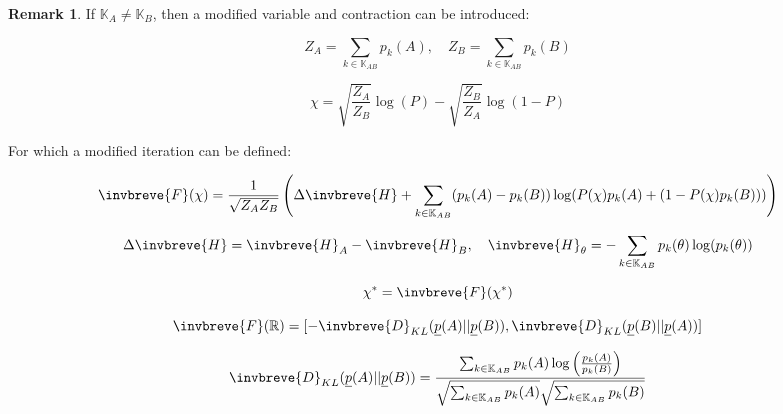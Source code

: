 \documentclass{article}
\theoremstyle{definition}
\newtheorem*{remark}{Remark}
\begin{document}
\begin{remark}
    If $\mathbb{K}_A \ne \mathbb{K}_B$, then a modified variable and contraction can be introduced:

    \begin{equation}
        Z_A = \sum_{k \in \mathbb{K}_{AB}} p_k(A), \quad Z_B = \sum_{k \in \mathbb{K}_{AB}} p_k(B)
    \end{equation}

    

    \begin{equation}
        \chi = \sqrt{\frac{Z_A}{Z_B}} \log(P) - \sqrt{\frac{Z_B}{Z_A}} \log(1-P)
    \end{equation}

    For which a modified iteration can be defined:

    \begin{equation}
        \invbreve{F}(\chi) = \frac{1}{\sqrt{Z_A Z_B}} 
        \left (
        \Delta \invbreve{H} +
        \sum_{k \in \mathbb{K}_{AB}} (p_k(A)-p_k(B)) \log(P(\chi) p_k(A) + (1-P(\chi) p_k(B)))
        \right )
    \end{equation}

    \begin{equation}
        \Delta \invbreve{H} = \invbreve{H}_A - \invbreve{H}_B, \quad
        \invbreve{H}_\theta = - \sum_{k\in \mathbb{K}_{AB}} p_k(\theta) \log(p_k(\theta))
    \end{equation}

    \begin{equation}
        \chi^* = \invbreve{F}(\chi^*)
    \end{equation}

    \begin{equation}
        \invbreve{F}(\mathbb{R}) = 
        [-\invbreve{D}_{KL}(\underline{p}(A)||\underline{p}(B)),
        \invbreve{D}_{KL}(\underline{p}(B)||\underline{p}(A))]
    \end{equation}

    \begin{equation}
        \invbreve{D}_{KL}(\underline{p}(A)||\underline{p}(B)) = 
        \frac{
        \sum_{k\in \mathbb{K}_{AB}} p_k(A)
        \log \left ( 
        \frac{p_k(A)}{p_k(B)}
        \right )
        }{\sqrt{\sum_{k \in \mathbb{K}_{AB}} p_k(A)}
        \sqrt{\sum_{k \in \mathbb{K}_{AB}} p_k(B)}}
    \end{equation}
    
    
\end{remark}
\end{document}
